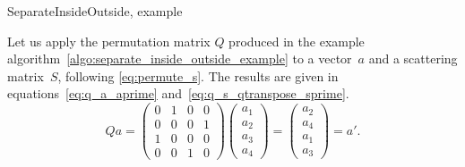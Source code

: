 \begin{algorithm}[H]
    \caption{SeparateInsideOutside, example}
    \label{algo:separate_inside_outside_example}
    \begin{algorithmic}
         
    \end{algorithmic}
\end{algorithm}
Let us apply the permutation matrix $Q$ produced in the example algorithm~\cref{algo:separate_inside_outside_example} to a vector~$a$ and a scattering matrix~$S$, following \cref{eq:permute_s}.
The results are given in equations~\cref{eq:q_a_aprime} and~\cref{eq:q_s_qtranspose_sprime}.
\begin{equation}
    Q a
    =
    \begin{pmatrix}
        0 & 1 & 0 & 0\\
        0 & 0 & 0 & 1\\
        1 & 0 & 0 & 0\\
        0 & 0 & 1 & 0
    \end{pmatrix}
    \begin{pmatrix}
        a_1 \\ a_2 \\ a_3 \\ a_4
    \end{pmatrix}
    =
    \begin{pmatrix}
        a_2 \\ a_4 \\ a_1 \\ a_3
    \end{pmatrix}
    =
    a'\text{.}
    \label{eq:q_a_aprime}
\end{equation}
